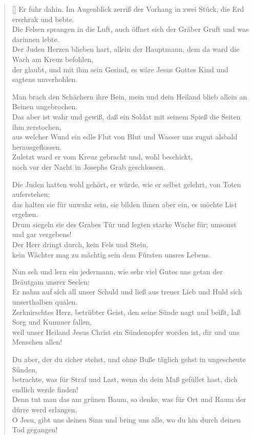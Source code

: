 \begin{center}
\begin{verse}[\versewidth]
 Er fuhr dahin. Im Augenblick zerriß der Vorhang in zwei Stück, die Erd erschrak und bebte.\\
Die Felsen sprangen in die Luft, auch öffnet sich der Gräber Gruft und was darinnen lebte.\\
Der Juden Herzen blieben hart, allein der Hauptmann, dem da ward die Wach am Kreuz befohlen,\\
der glaubt, und mit ihm sein Gesind, es wäre Jesus Gottes Kind und sagtens unverhohlen.

 Man brach den Schächern ihre Bein, mein und dein Heiland blieb allein an Beinen ungebrochen.\\
Das aber ist wahr und gewiß, daß ein Soldat mit seinem Spieß die Seiten ihm zerstochen,\\
aus welcher Wund ein edle Flut von Blut und Wasser uns zugut alsbald herausgeflossen.\\
Zuletzt ward er vom Kreuz gebracht und, wohl beschickt,\\
noch vor der Nacht in Josephs Grab geschlossen.

 Die Juden hatten wohl gehört, er würde, wie er selbst gelehrt, von Toten auferstehen;\\
das halten sie für unwahr sein, sie bilden ihnen aber ein, es möchte List ergehen.\\
Drum siegeln sie des Grabes Tür und legten starke Wache für; umsonst und gar vergebens!\\
Der Herr dringt durch, kein Fels und Stein,\\
kein Wächter mag zu mächtig sein dem Fürsten unsres Lebens.

 Nun seh und lern ein jedermann, wie sehr viel Gutes uns getan der Bräutgam unsrer Seelen:\\
Er nahm auf sich all unser Schuld und ließ aus treuer Lieb und Huld sich unserthalben quälen.\\
Zerknirschtes Herz, betrübter Geist, den seine Sünde nagt und beißt, laß Sorg und Kummer fallen,\\
weil unser Heiland Jesus Christ ein Sündenopfer worden ist, dir und uns Menschen allen!

 Du aber, der du sicher stehst, und ohne Buße täglich gehst in ungescheute Sünden,\\
betrachte, was für Straf und Last, wenn du dein Maß gefüllet hast, dich endlich werde finden!\\
Denn tut man das am grünen Baum, so denke, was für Ort und Raum der dürre werd erlangen.\\
O Jesu, gibt uns deinen Sinn und bring uns alle, wo du hin durch deinen Tod gegangen!
  
\end{verse}
\end{center}




